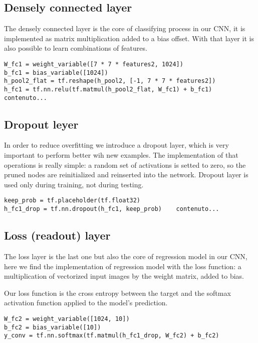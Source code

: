 \subsection{Densely connected layer}

The densely connected layer is the core of classifying process in our \acs{CNN}, it is implemented as matrix multiplication added to a bias offset. With that layer it is also possible to learn combinations of features.

\begin{lstlisting}
W_fc1 = weight_variable([7 * 7 * features2, 1024])
b_fc1 = bias_variable([1024])
h_pool2_flat = tf.reshape(h_pool2, [-1, 7 * 7 * features2])
h_fc1 = tf.nn.relu(tf.matmul(h_pool2_flat, W_fc1) + b_fc1)	contenuto...
\end{lstlisting}

\subsection{Dropout leyer}

In order to reduce overfitting we introduce a dropout layer, which is very important to perform better wih new examples. The implementation of that operations is really simple: a random set of activations is setted to zero, so the pruned nodes are reinitialized and reinserted into the network. Dropout layer is used only during training, not during testing.

\begin{lstlisting}
keep_prob = tf.placeholder(tf.float32)
h_fc1_drop = tf.nn.dropout(h_fc1, keep_prob)	contenuto...
\end{lstlisting}

\subsection{Loss (readout) layer}

The loss layer is the last one but also the core of regression model in our \acs{CNN}, here we find the implementation of regression model with the loss function: a multiplication of vectorized input images by the weight matrix, added to bias.

Our loss function is the cross entropy between the target and the softmax activation function applied to the model's prediction.

\begin{lstlisting}
W_fc2 = weight_variable([1024, 10])
b_fc2 = bias_variable([10])
y_conv = tf.nn.softmax(tf.matmul(h_fc1_drop, W_fc2) + b_fc2)
\end{lstlisting}
